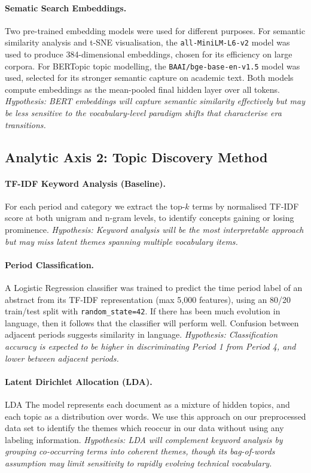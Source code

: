 \documentclass{article}
\begin{document}
\paragraph{Sematic Search Embeddings.}
Two pre-trained embedding models were used for different
purposes. For semantic similarity analysis and t-SNE
visualisation, the \texttt{all-MiniLM-L6-v2} model
\citep{reimers-2019-sentence-bert} was used to produce
384-dimensional embeddings, chosen for its efficiency on
large corpora. For BERTopic topic modelling, the
\texttt{BAAI/bge-base-en-v1.5} model \citep{bge2023}
was used, selected for its stronger semantic capture
on academic text. Both models compute embeddings as the
mean-pooled final hidden layer over all tokens.
\textit{Hypothesis: BERT embeddings will capture semantic
similarity effectively but may be less sensitive to the
vocabulary-level paradigm shifts that characterise era
transitions.}

\subsection{Analytic Axis 2: Topic Discovery Method}
\label{subsec:comparison}

\paragraph{TF-IDF Keyword Analysis (Baseline).}
For each period and category we extract the top-$k$ terms
by normalised TF-IDF score at both unigram and n-gram
levels, to identify concepts gaining or losing prominence.
\textit{Hypothesis: Keyword analysis will be the most
interpretable approach but may miss latent themes spanning
multiple vocabulary items.}

\paragraph{Period Classification.}
A Logistic Regression classifier \citep{scikit-learn} was
trained to predict the time period label of an abstract
from its TF-IDF representation (max 5,000 features), using
an 80/20 train/test split with \texttt{random\_state=42}.
If there has been much evolution in language,
then it follows that the classifier will perform well. Confusion between adjacent periods suggests similarity in language.
\textit{Hypothesis: Classification accuracy is expected to be higher in discriminating Period 1 from Period 4, and lower between adjacent periods.}

\paragraph{Latent Dirichlet Allocation (LDA).}
LDA \citep{blei2003latent} The model represents each document as a mixture of hidden topics, and each topic as a distribution over words.
We use this approach on our preprocessed data set to identify the themes which reoccur in our data without using any labeling information.
\textit{Hypothesis: LDA will complement keyword analysis by grouping co-occurring terms into coherent themes, though its bag-of-words assumption may limit sensitivity to rapidly evolving technical vocabulary.}
\end{document}
